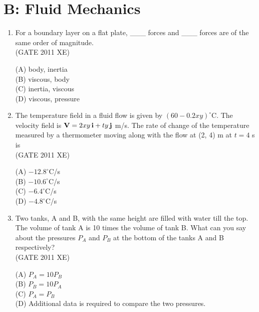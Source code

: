 \documentclass[journal,12pt,onecolumn]{IEEEtran}
\begin{document}
\section*{B: Fluid Mechanics}
\vspace{1cm}
\begin{enumerate}

\item For a boundary layer on a flat plate, \_\_\_ forces and \_\_\_ forces are of the same order of magnitude.\\

\hfill{(GATE 2011 XE)} \\
\begin{multicols}{4}
(A) body, inertia\\
(B) viscous, body\\
(C) inertia, viscous\\
(D) viscous, pressure
\end{multicols}

\item The temperature field in a fluid flow is given by $(60 - 0.2 x y)^\circ$C. The velocity field is ${\bf V} = 2 x y\, \mathbf{i} + t y\, \mathbf{j}$ m/s. The rate of change of the temperature measured by a thermometer moving along with the flow at (2, 4) m at $t=4$ s is\\

\hfill{(GATE 2011 XE)} \\
\begin{multicols}{4}
(A) $-12.8^\circ$C/s\\
(B) $-10.6^\circ$C/s\\
(C) $-6.4^\circ$C/s\\
(D) $-4.8^\circ$C/s
\end{multicols}

\item Two tanks, A and B, with the same height are filled with water till the top. The volume of tank A is 10 times the volume of tank B. What can you say about the pressures $P_A$ and $P_B$ at the bottom of the tanks A and B respectively?\\

\hfill{(GATE 2011 XE)} \\
\begin{multicols}{2}
(A) $P_A = 10 P_B$\\
(B) $P_B = 10 P_A$\\
(C) $P_A = P_B$\\
(D) Additional data is required to compare the two pressures.
\end{multicols}


\end{enumerate}
\end{document}
